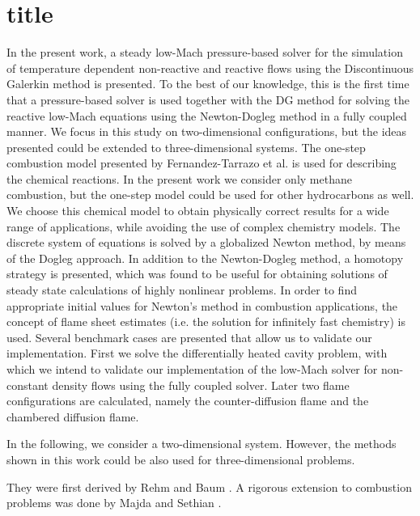 \section{title}
In the present work, a steady low-Mach pressure-based solver for the simulation of temperature dependent non-reactive and reactive flows using the Discontinuous Galerkin method is presented.
To the best of our knowledge, this is the first time that a pressure-based solver is used together with the DG method for solving the reactive low-Mach equations using the Newton-Dogleg method in a fully coupled manner. We focus in this study on two-dimensional configurations, but the ideas presented could be extended to three-dimensional systems. The one-step combustion model presented by Fernandez-Tarrazo et al. \textcite{fernandez-tarrazoSimpleOnestepChemistry2006} is used for describing the chemical reactions. In the present work we consider only methane combustion, but the one-step model could be used for other hydrocarbons as well. We choose this chemical model to obtain physically correct results for a wide range of applications, while avoiding the use of complex chemistry models. The discrete system of equations is solved by a globalized Newton method, by means of the Dogleg approach. In addition to the Newton-Dogleg method, a homotopy strategy is presented, which was found to be useful for obtaining solutions of steady state calculations of highly nonlinear problems. In order to find appropriate initial values for Newton's method in combustion applications, the concept of flame sheet estimates (i.e. the solution for infinitely fast chemistry) is used. Several benchmark cases are presented that allow us to validate our implementation. First we solve the differentially heated cavity problem, with which we intend to validate our implementation of the low-Mach solver for non-constant density flows using the fully coupled solver. Later two flame configurations are calculated, namely the counter-diffusion flame and the chambered diffusion flame. \parencite{matalonDiffusionFlamesChamber1980}

In the following, we consider a two-dimensional system. However, the methods shown in this work could be also used for three-dimensional problems.

They were first derived by Rehm and Baum \parencite{rehmEquationsMotionThermally1978}. A rigorous extension to combustion problems was done by Majda and Sethian \parencite{majdaDerivationNumericalSolution1985}.



